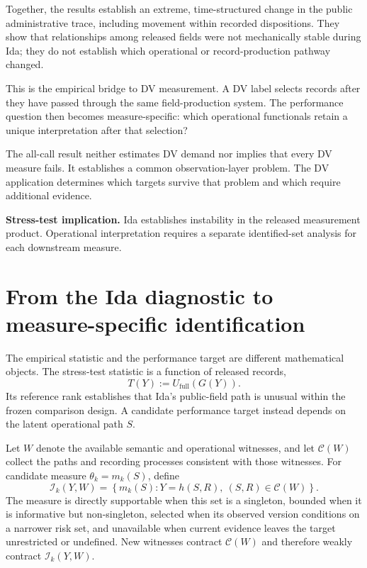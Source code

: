 \documentclass[11pt]{article}
\begin{document}
Together, the results establish an extreme, time-structured change in the public administrative trace, including movement within recorded dispositions. They show that relationships among released fields were not mechanically stable during Ida; they do not establish which operational or record-production pathway changed.

This is the empirical bridge to DV measurement. A DV label selects records after they have passed through the same field-production system. The performance question then becomes measure-specific: which operational functionals retain a unique interpretation after that selection?

The all-call result neither estimates DV demand nor implies that every DV measure fails. It establishes a common observation-layer problem. The DV application determines which targets survive that problem and which require additional evidence.

\begin{resultbox}
\textbf{Stress-test implication.} Ida establishes instability in the released measurement product. Operational interpretation requires a separate identified-set analysis for each downstream measure.
\end{resultbox}

\section{From the Ida diagnostic to measure-specific identification}

The empirical statistic and the performance target are different mathematical objects. The stress-test statistic is a function of released records,
\begin{equation}
T(Y):=U_{\mathrm{full}}(G(Y)).
\label{eq:diagnostic}
\end{equation}
Its reference rank establishes that Ida's public-field path is unusual within the frozen comparison design. A candidate performance target instead depends on the latent operational path $S$.

Let $W$ denote the available semantic and operational witnesses, and let $\mathcal C(W)$ collect the paths and recording processes consistent with those witnesses. For candidate measure $\theta_k=m_k(S)$, define
\begin{equation}
\mathcal I_k(Y,W)
=
\left\{m_k(S):Y=h(S,R),\ (S,R)\in\mathcal C(W)\right\}.
\label{eq:measure_set}
\end{equation}
The measure is directly supportable when this set is a singleton, bounded when it is informative but non-singleton, selected when its observed version conditions on a narrower risk set, and unavailable when current evidence leaves the target unrestricted or undefined. New witnesses contract $\mathcal C(W)$ and therefore weakly contract $\mathcal I_k(Y,W)$.
\end{document}
